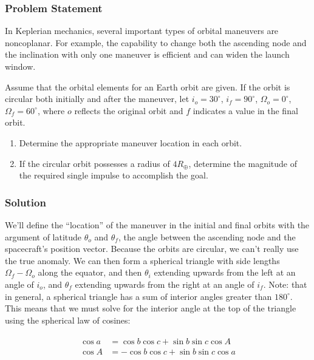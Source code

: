 \documentclass[
]{article}
\providecommand{\tightlist}{%
  \setlength{\itemsep}{0pt}\setlength{\parskip}{0pt}}
\begin{document}
\subsubsection{Problem Statement}\label{problem-statement-1}

In Keplerian mechanics, several important types of orbital maneuvers are
noncoplanar. For example, the capability to change both the ascending
node and the inclination with only one maneuver is efficient and can
widen the launch window.

Assume that the orbital elements for an Earth orbit are given. If the
orbit is circular both initially and after the maneuver, let
\(i_o=30^\circ\), \(i_f=90^\circ\), \(\Omega_o=0^\circ\),
\(\Omega_f=60^\circ\), where \(o\) reflects the original orbit and \(f\)
indicates a value in the final orbit.

\begin{enumerate}
\tightlist
\item
  Determine the appropriate maneuver location in each orbit.
\item
  If the circular orbit possesses a radius of \(4R_\oplus\), determine
  the magnitude of the required single impulse to accomplish the goal.
\end{enumerate}

\subsubsection{Solution}\label{solution-1}

We'll define the ``location'' of the maneuver in the initial and final
orbits with the argument of latitude \(\theta_o\) and \(\theta_f\), the
angle between the ascending node and the spacecraft's position vector.
Because the orbits are circular, we can't really use the true anomaly.
We can then form a spherical triangle with side lengths
\(\Omega_f - \Omega_o\) along the equator, and then \(\theta_i\)
extending upwards from the left at an angle of \(i_o\), and \(\theta_f\)
extending upwards from the right at an angle of \(i_f\). Note: that in
general, a spherical triangle has a sum of interior angles greater than
\(180^\circ\). This means that we must solve for the interior angle at
the top of the triangle using the spherical law of cosines:

\[\begin{aligned}
\begin{aligned}
    \cos a &= \cos b \cos c + \sin b \sin c \cos A \\
    \cos A &= - \cos b \cos c + \sin b \sin c \cos a \\
\end{aligned}
\end{aligned}\]
\end{document}
